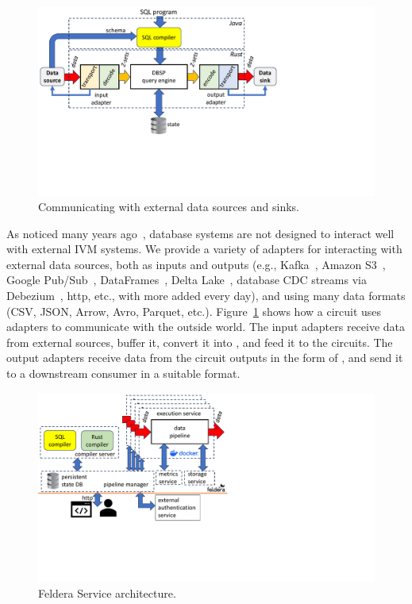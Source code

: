 \begin{figure}[h]
  \begin{center}
  \includegraphics[trim={0 2.2inin 3.7in 0},clip,scale=.33]{adapters.pdf}
  \caption{\label{fig:adapters}Communicating with external data
    sources and sinks.}
  \end{center}
\end{figure}

As noticed many years ago~\cite{labio-vldb00}, database systems are
not designed to interact well with external IVM systems.  We provide a
variety of adapters for interacting with external data sources, both
as inputs and outputs (e.g., Kafka~\cite{kreps-netdb11}, Amazon
S3~\cite{palankar-dadc08}, Google Pub/Sub~\cite{pubsub},
DataFrames~\cite{pandas12}, Delta Lake~\cite{armbrust-vldb20},
database CDC streams via Debezium~\cite{debezium}, http, etc., with
more added every day), and using many data formats (CSV, JSON, Arrow,
Avro, Parquet, etc.).  Figure~\ref{fig:adapters} shows how a circuit
uses adapters to communicate with the outside world.  The input
adapters receive data from external sources, buffer it, convert it
into \zrs, and feed it to the circuits.  The output adapters receive
data from the circuit outputs in the form of \zrs, and send it to a
downstream consumer in a suitable format.

\begin{figure}[h]
  \begin{center}
  \includegraphics[trim={0 2.4in 4.3in 0},clip,scale=.44]{services.pdf}
  \caption{\label{fig:service}Feldera Service architecture.}
  \end{center}
\end{figure}

